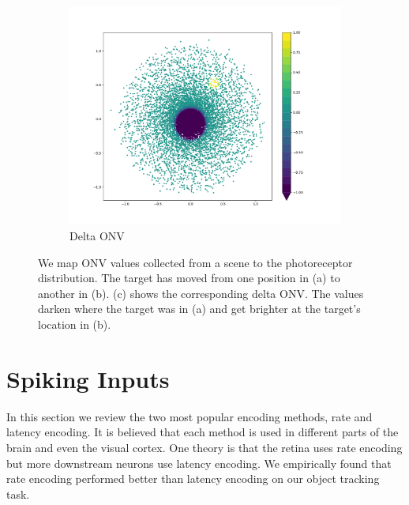 \documentclass [MS] {UCLAthesis}
\begin{document}
\begin{figure}
    \hfill
    \begin{subfigure}[b]{0.49\textwidth}
        \centering
        \includegraphics[width=\textwidth]{onv_delta}
        \caption{Delta ONV}
        \label{fig:onv_delta}
    \end{subfigure}
    \caption[Normal and delta ONV for a moving target]{We map ONV values collected from a scene to the photoreceptor distribution. The target has moved from one position in (a) to another in (b). (c) shows the corresponding delta ONV. The values darken where the target was in (a) and get brighter at the target's location in (b).}
    \label{fig:three ONVs}
\end{figure}


\section{Spiking Inputs}

In this section we review the two most popular encoding methods, rate and latency encoding. It is believed that each method is used in different parts of the brain and even the visual cortex. One theory is that the retina uses rate encoding but more downstream neurons use latency encoding. We empirically found that rate encoding performed better than latency encoding on our object tracking task.

\end{document}
